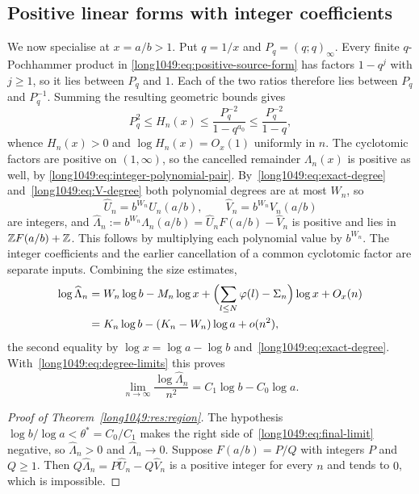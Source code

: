 \documentclass[11pt]{article}
\begin{document}
\subsection{Positive linear forms with integer coefficients}\label{long1049:sec:integer-forms}

We now specialise at $x=a/b>1$. Put $q=1/x$ and $P_q=(q;q)_\infty$.
Every finite $q$-Pochhammer product in
\eqref{long1049:eq:positive-source-form} has factors $1-q^j$ with $j\ge1$,
so it lies between $P_q$ and $1$. Each of the two ratios therefore lies
between $P_q$ and $P_q^{-1}$. Summing the resulting geometric bounds gives
\[
 P_q^{2}\le H_n(x)\le\frac{P_q^{-2}}{1-q^{a_0}}\le\frac{P_q^{-2}}{1-q},
\]
whence $H_n(x)>0$ and $\log H_n(x)=O_x(1)$ uniformly in $n$.
The cyclotomic factors are positive on $(1,\infty)$, so the cancelled
remainder $\Lambda_n(x)$ is positive as well, by
\eqref{long1049:eq:integer-polynomial-pair}.
By~\eqref{long1049:eq:exact-degree} and~\eqref{long1049:eq:V-degree} both polynomial degrees are
at most $W_n$, so
\[
 \widehat U_n=b^{W_n}U_n(a/b),\qquad \widehat V_n=b^{W_n}V_n(a/b)
\]
are integers, and $\widehat\Lambda_n:=b^{W_n}\Lambda_n(a/b)
=\widehat U_nF(a/b)-\widehat V_n$ is positive and lies in $\mathbb{Z} F(a/b)+\mathbb{Z}$.  This
follows by multiplying each polynomial value by $b^{W_n}$.
The integer coefficients and the earlier cancellation of a common
cyclotomic factor are separate inputs.
Combining the size estimates,
\[
 \begin{aligned}
 \log\widehat\Lambda_n
 &=W_n\log b-M_n\log x+\Bigl(\sum_{l\le N}\varphi(l)-\Sigma_n\Bigr)\log x+O_x(n)\\
 &=K_n\log b-(K_n-W_n)\log a+o(n^{2}),
\end{aligned}
\]
the second equality by $\log x=\log a-\log b$ and~\eqref{long1049:eq:exact-degree}.
With~\eqref{long1049:eq:degree-limits} this proves
\begin{equation}\label{long1049:eq:final-limit}
 \lim_{n\to\infty}\frac{\log\widehat\Lambda_n}{n^{2}}=C_1\log b-C_0\log a .
\end{equation}

\begin{proof}[Proof of Theorem~\ref{long1049:res:region}]
The hypothesis $\log b/\log a<\theta^{*}=C_0/C_1$ makes the right side
of~\eqref{long1049:eq:final-limit} negative, so $\widehat\Lambda_n>0$ and
$\widehat\Lambda_n\to0$.  Suppose $F(a/b)=P/Q$ with integers $P$ and $Q\ge1$.
Then $Q\widehat\Lambda_n=P\widehat U_n-Q\widehat V_n$ is a positive integer for
every $n$ and tends to $0$, which is impossible.
\end{proof}
\end{document}
